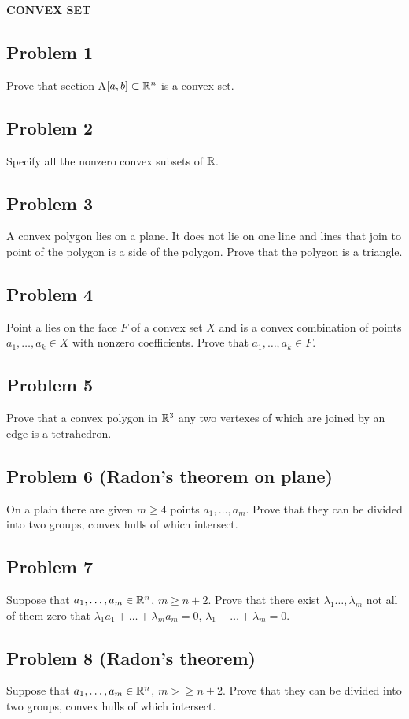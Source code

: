 \centerline{\bf CONVEX SET}
\bigskip
\subsection{Problem 1}
Prove that section A$[a,b]\subset \Bbb R^n$ is a convex set.
\subsection{Problem 2}
Specify all the nonzero convex subsets of $\Bbb R$.
\subsection{Problem 3}
A convex polygon lies on a plane. It does not lie on one line
and lines that join to point of the polygon is a side of the
polygon. Prove that the polygon is a triangle.
\subsection{Problem 4}
Point a lies on the face $F$ of a convex set $X$ and is
a convex combination of points $a_1,\dots, a_k\in X$ with nonzero
coefficients. Prove that $a_1, \dots,a_k\in F$.
\subsection{Problem 5}
Prove that a convex polygon in $\Bbb R^3$ any two vertexes
of which are joined by an edge is a tetrahedron.
\subsection{Problem 6 {\rm (Radon's theorem on plane)}}
On a plain there are given $m\geq 4$ points $a_1,\dots, a_m$.
Prove that they can be divided into two groups, convex hulls of
which intersect.
\subsection{Problem 7}
Suppose that $a_1, \dots, a_m\in \Bbb R^n$, $m\geq n+2$. Prove
that there exist $\lambda_1\dots, \lambda_m$ not all of them zero
that $\lambda_1a_1+ \dots +\lambda_m a_m=0$, $\lambda_1+\dots
+\lambda_m=0$.
\subsection{Problem 8 {\rm (Radon's theorem)}}
Suppose that $a_1, \dots, a_m\in \Bbb R^n$, $m>\geq n+2$. Prove
that they can be divided into two groups, convex hulls of which
intersect.
